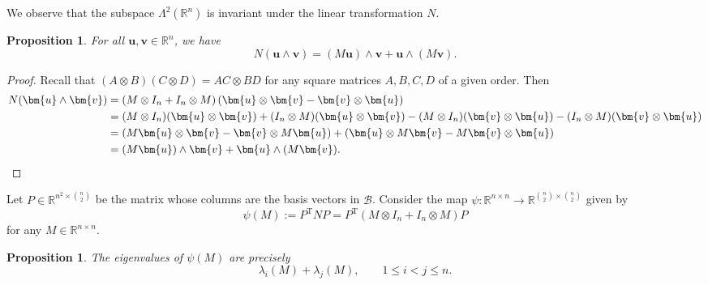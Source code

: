 \documentclass[11pt]{article}
\theoremstyle{plain}
\newtheorem{proposition}[theorem]{Proposition}
\theoremstyle{definition}
\numberwithin{equation}{section}
\begin{document}
We observe that the subspace $\Lambda^2 (\mathbb{R}^n)$ is invariant under the linear transformation $N$.

\begin{proposition}\label{prop:N_invariant} 
For all $\bm{u}, \bm{v}\in \mathbb{R}^n$, we have 
\[ 
N(\bm{u}\wedge \bm{v}) = (M\bm{u})\wedge \bm{v} + \bm{u}\wedge (M\bm{v}).
\]
\end{proposition}

\begin{proof}
Recall that $(A \otimes B)(C \otimes D) = AC \otimes BD$ for any square matrices $A, B, C, D$ of a given order. Then 
\begin{align*}
N(\bm{u}\wedge \bm{v}) &= \left(M \otimes I_n + I_n \otimes M \right) (\bm{u} \otimes \bm{v} - \bm{v} \otimes \bm{u}) \\
& = (M \otimes I_n)(\bm{u} \otimes \bm{v}) + (I_n \otimes M)(\bm{u} \otimes \bm{v}) - (M \otimes I_n)(\bm{v} \otimes \bm{u}) - (I_n \otimes M)(\bm{v} \otimes \bm{u}) \\
& = (M\bm{u} \otimes \bm{v} - \bm{v} \otimes M\bm{u}) + (\bm{u} \otimes M\bm{v} - M\bm{v} \otimes \bm{u}) \\
& = (M\bm{u})\wedge \bm{v} + \bm{u}\wedge (M\bm{v}). \qedhere
\end{align*}
\end{proof}

Let $P \in \mathbb{R}^{n^2 \times \binom{n}{2}}$ be the matrix whose columns are the basis 
vectors in $\mathcal{B}$. Consider the map 
$\psi: \mathbb{R}^{n\times n}\rightarrow \mathbb{R}^{\binom{n}{2} \times \binom{n}{2}}$ given by
\begin{equation}\label{eq:psi-M}
\psi(M):= P^{\mathrm{T}} N P = P^{\mathrm{T}}(M\otimes I_n+I_n\otimes M)P
\end{equation}
for any $M\in \mathbb{R}^{n\times n}$.

\begin{proposition}
The eigenvalues of $\psi(M)$ are precisely
\[ 
\lambda_i(M)+\lambda_j(M), \qquad 1\leq i<j\leq n. 
\]
\end{proposition}
\end{document}
